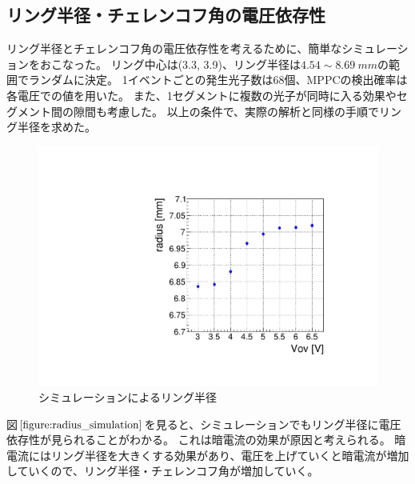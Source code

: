 \documentclass[uplatex, titlepage, dvipdfmx, 12pt, a4paper]{jsreport}
\begin{document}
    \subsection{リング半径・チェレンコフ角の電圧依存性}
    リング半径とチェレンコフ角の電圧依存性を考えるために、簡単なシミュレーションをおこなった。
    リング中心は(3.3, 3.9)、リング半径は$4.54\sim\SI{8.69}{mm}$の範囲でランダムに決定。
    1イベントごとの発生光子数は68個、MPPCの検出確率は各電圧での値を用いた。
    また、1セグメントに複数の光子が同時に入る効果やセグメント間の隙間も考慮した。
    以上の条件で、実際の解析と同様の手順でリング半径を求めた。
    \begin{figure}[h]
      \begin{center} 
        \includegraphics[scale=0.4, clip]{image/radius_simulation.pdf}
        \caption{シミュレーションによるリング半径} 
        \label{fig:radius_simulation} 
      \end{center}
    \end{figure}
    図$\ref{figure:radius_simulation}$を見ると、シミュレーションでもリング半径に電圧依存性が見られることがわかる。
    これは暗電流の効果が原因と考えられる。
    暗電流にはリング半径を大きくする効果があり、電圧を上げていくと暗電流が増加していくので、リング半径・チェレンコフ角が増加していく。
\end{document}
